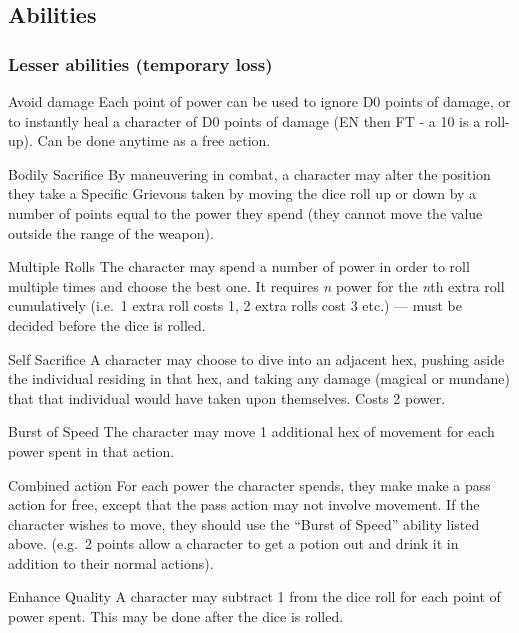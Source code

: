 \documentclass[a4paper]{article}
\begin{document}
\begin{multicols}{2}
\subsection{Abilities}

\subsubsection{Lesser abilities (temporary loss)}

\begin{Description}

\item[Avoid damage] Each point of power can be used to ignore D0
points of damage, or to instantly heal a character of D0 points of
damage (EN then FT - a 10 is a roll-up).  Can be done anytime as a
free action.

\item[Bodily Sacrifice] By maneuvering in combat, a character may
alter the position they take a Specific Grievous taken by moving the
dice roll up or down by a number of points equal to the power they
spend (they cannot move the value outside the range of the weapon).

\item[Multiple Rolls] The character may spend a number of power in
order to roll multiple times and choose the best one.  It requires
\emph{n} power for the \emph{n}th extra roll cumulatively (i.e.\ 1
extra roll costs 1, 2 extra rolls cost 3 etc.) --- must be decided
before the dice is rolled.

\item[Self Sacrifice] A character may choose to dive into an adjacent
hex, pushing aside the individual residing in that hex, and taking any
damage (magical or mundane) that that individual would have taken upon
themselves.  Costs 2 power.

\item[Burst of Speed] The character may move 1 additional hex of
movement for each power spent in that action.

\item[Combined action] For each power the character spends, they make
make a pass action for free, except that the pass action may not
involve movement.  If the character wishes to move, they should use
the ``Burst of Speed'' ability listed above.  (e.g.\ 2 points allow a
character to get a potion out and drink it in addition to their normal
actions).

\item[Enhance Quality] A character may subtract 1 from the dice roll
for each point of power spent.  This may be done after the dice is
rolled.


\end{Description}
\end{multicols}
\end{document}
